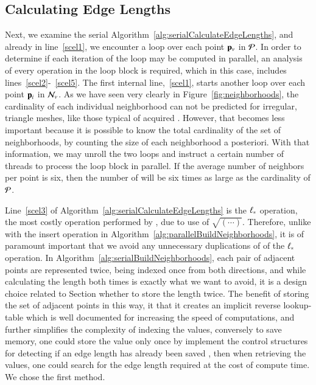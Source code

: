 \subsection{Calculating Edge Lengths}
\label{ch5sPAssCEL}
Next, we examine the serial Algorithm~\ref{alg:serialCalculateEdgeLengths}, and already in line~\ref{scel1}, we encounter a loop over each point $\mathbf{p}_v$ in $\mathcal{P}$. In order to determine if each iteration of the loop may be computed in parallel, an analysis of every operation in the loop block is required, which in this case, includes lines~\ref{scel2}-~\ref{scel5}. The first internal line,~\ref{scel1}, starts another loop over each point $\mathbf{p}_i$ in $\mathcal{N}_v$.  As we have seen very clearly in Figure~\ref{fig:neighborhoods}, the cardinality of each individual neighborhood can not be predicted for irregular, triangle meshes, like those typical of acquired \tdd{}. However, that becomes less important because it is possible to know the total cardinality of the set of neighborhoods, by counting the size of each neighborhood a posteriori. With that information, we may unroll the two loops and instruct a certain number of threads to process the loop block in parallel. If the average number of neighbors per point is six, then the number of will be six times as large as the cardinality of $\mathcal{P}$. 

Line~\ref{scel3} of Algorithm~\ref{alg:serialCalculateEdgeLengths} is the $\ell_\ast$ operation, the most costly operation performed by , due to use of $\sqrt{(\cdots)}$. Therefore, unlike with the insert operation in Algorithm~\ref{alg:parallelBuildNeighborhoods}, it is of paramount important that we avoid any unnecessary duplications of of the $\ell_\ast$ operation. In Algorithm~\ref{alg:serialBuildNeighborhoods}, each pair of adjacent points are represented twice, being indexed once from both directions, and while calculating the length both times is exactly what we want to avoid, it is a design choice related to Section whether to store the length twice. The benefit of storing the set of adjacent points in this way, it that it creates an implicit reverse lookup-table which is well documented for increasing the speed of computations, and further simplifies the complexity of indexing the values, conversely to save memory, one could store the value only once by implement the control structures for detecting if an edge length has already been saved , then when retrieving the values, one could search for the edge length required at the cost of compute time. We chose the first method.


